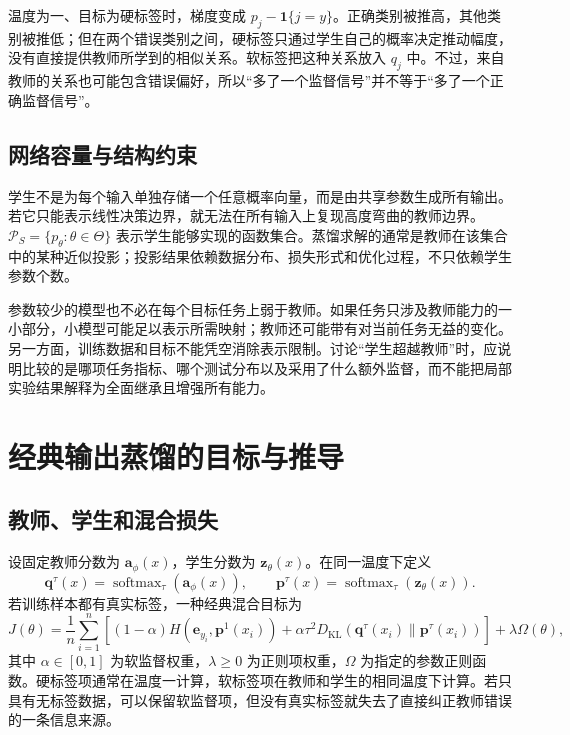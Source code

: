 \documentclass[UTF8,12pt,a4paper,fontset=fandol]{ctexart}
\begin{document}
温度为一、目标为硬标签时，梯度变成 $p_j-\mathbf1\{j=y\}$。正确类别被推高，其他类别被推低；但在两个错误类别之间，硬标签只通过学生自己的概率决定推动幅度，没有直接提供教师所学到的相似关系。软标签把这种关系放入 $q_j$ 中。不过，来自教师的关系也可能包含错误偏好，所以“多了一个监督信号”并不等于“多了一个正确监督信号”。

\subsection{网络容量与结构约束}
学生不是为每个输入单独存储一个任意概率向量，而是由共享参数生成所有输出。若它只能表示线性决策边界，就无法在所有输入上复现高度弯曲的教师边界。 $\mathcal P_S=\{p_\theta:\theta\in\Theta\}$ 表示学生能够实现的函数集合。蒸馏求解的通常是教师在该集合中的某种近似投影；投影结果依赖数据分布、损失形式和优化过程，不只依赖学生参数个数。

参数较少的模型也不必在每个目标任务上弱于教师。如果任务只涉及教师能力的一小部分，小模型可能足以表示所需映射；教师还可能带有对当前任务无益的变化。另一方面，训练数据和目标不能凭空消除表示限制。讨论“学生超越教师”时，应说明比较的是哪项任务指标、哪个测试分布以及采用了什么额外监督，而不能把局部实验结果解释为全面继承且增强所有能力。

\section{经典输出蒸馏的目标与推导}
\label{sec:kd-classical}

\subsection{教师、学生和混合损失}
设固定教师分数为 $\mathbf a_\phi(x)$，学生分数为 $\mathbf z_\theta(x)$。在同一温度下定义
\[
 \mathbf q^\tau(x)=\operatorname{softmax}_\tau(\mathbf a_\phi(x)),\qquad
 \mathbf p^\tau(x)=\operatorname{softmax}_\tau(\mathbf z_\theta(x)).
\]
若训练样本都有真实标签，一种经典混合目标为
\begin{equation}
 J(\theta)=\frac1n\sum_{i=1}^n\left[
 (1-\alpha)H(\mathbf e_{y_i},\mathbf p^1(x_i))
 +\alpha\tau^2D_{\mathrm{KL}}(\mathbf q^\tau(x_i)\|\mathbf p^\tau(x_i))
 \right]+\lambda\Omega(\theta),
 \label{eq:kd-classical}
\end{equation}
其中 $\alpha\in[0,1]$ 为软监督权重，$\lambda\geq0$ 为正则项权重，$\Omega$ 为指定的参数正则函数。硬标签项通常在温度一计算，软标签项在教师和学生的相同温度下计算。若只具有无标签数据，可以保留软监督项，但没有真实标签就失去了直接纠正教师错误的一条信息来源。
\end{document}

